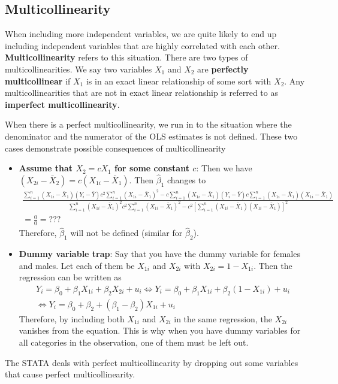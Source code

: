 \documentclass[12pt]{article}
\theoremstyle{definition}
\theoremstyle{property}
\theoremstyle{assumption}
\theoremstyle{example}
\theoremstyle{comment}
\begin{document}
\subsection{Multicollinearity}
When including more independent variables, we are quite likely to end up including independent variables that are highly correlated with each other. \textbf{Multicollinearity} refers to this situation. There are two types of multicollinearities. We say two variables $X_1$ and $X_2$ are \textbf{perfectly multicollinear} if $X_1$ is in an exact linear relationship of some sort with $X_2$. Any multicollinearities that are not in exact linear relationship is referred to as \textbf{imperfect multicollinearity}. \par\medskip

When there is a perfect multicollinearity, we run in to the situation where the denominator and the numerator of the OLS estimates is not defined. These two cases demonstrate possible consequences of multicollinearity
\begin{itemize}
\item \textbf{Assume that $X_2 = cX_1$ for some constant $c$}: Then we have $(X_{2i}-\bar{X}_2)=c(X_{1i}-\bar{X}_1)$. Then $\hat{\beta}_1$ changes to
\scriptsize{\begin{gather*}
\frac{\sum_{i=1}^n (X_{1i}-\bar{X}_1)(Y_{i}-\bar{Y})c^2\sum_{i=1}^n(X_{1i}-\bar{X}_1)^2-c\sum_{i=1}^n (X_{1i}-\bar{X}_1)(Y_{i}-\bar{Y})c\sum_{i=1}^n(X_{1i}-\bar{X}_1)(X_{1i}-\bar{X}_1)}{\sum_{i=1}^n (X_{1i}-\bar{X}_1)^2 c^2\sum_{i=1}^n (X_{1i}-\bar{X}_1)^2-c^2[\sum_{i=1}^n (X_{1i}-\bar{X}_1)(X_{1i}-\bar{X}_1)]^2} \\
=\frac{0}{0} = ???
\end{gather*}}\normalsize
Therefore, $\hat{\beta}_1$ will not be defined (similar for $\hat{\beta}_2$).
\item \textbf{Dummy variable trap}: Say that you have the dummy variable for females and males. Let each of them be $X_{1i}$ and $X_{2i}$ with $X_{2i}=1-X_{1i}$. Then the regression can be written as
\begin{gather*}
Y_i = \beta_0 + \beta_1X_{1i} + \beta_2X_{2i} + u_i \iff Y_i = \beta_0 + \beta_1X_{1i} + \beta_2(1-X_{1i}) + u_i \\
\iff Y_i = \beta_0 + \beta_2 +(\beta_1-\beta_2)X_{1i}+u_i
\end{gather*}
Therefore, by including both $X_{1i}$ and $X_{2i}$ in the same regression, the $X_{2i}$ vanishes from the equation. This is why when you have dummy variables for all categories in the observation, one of them must be left out.
\end{itemize} \par\medskip
The STATA deals with perfect multicollinearity by dropping out some variables that cause perfect multicollinearity.
\end{document}
